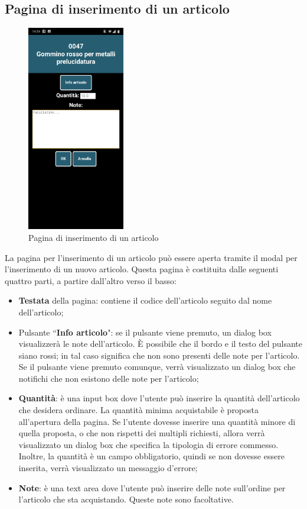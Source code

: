 \newpage
 
 \subsection{Pagina di inserimento di un articolo}
 
\begin{figure}[h]
	\centering
	\includegraphics[width=.3\textwidth,height=9cm]{./img/notePresenti.jpg}
	\caption{Pagina di inserimento di un articolo}
\end{figure}
 
La pagina per l'inserimento di un articolo può essere aperta tramite il modal per l'inserimento di un nuovo articolo. Questa pagina è
costituita dalle seguenti quattro parti, a partire dall'altro verso il basso:
\begin{itemize}
	\item \textbf{Testata} della pagina: contiene il codice dell'articolo seguito dal nome dell'articolo;
	\item Pulsante ``\textbf{Info articolo}": se il pulsante viene premuto, un dialog box visualizzerà le note dell'articolo. È possibile che il bordo
	e il testo del pulsante siano rossi; in tal caso significa che non sono presenti delle note per l'articolo. Se il pulsante viene premuto
	comunque, verrà visualizzato un dialog box che notifichi che non esistono delle note per l'articolo;
	\item \textbf{Quantità}: è una input box dove l'utente può inserire la quantità dell'articolo che desidera ordinare. La quantità
	minima acquistabile è proposta all'apertura della pagina. Se l'utente dovesse inserire una quantità minore di quella proposta, o che non rispetti dei
	multipli richiesti, allora verrà visualizzato un dialog box che specifica la tipologia di errore commesso. Inoltre, la quantità è un campo obbligatorio, quindi se non dovesse essere inserita, verrà visualizzato un messaggio d'errore;
	\item \textbf{Note}: è una text area dove l'utente può inserire delle note sull'ordine per l'articolo che sta acquistando. Queste note sono
	facoltative.
\end{itemize}

